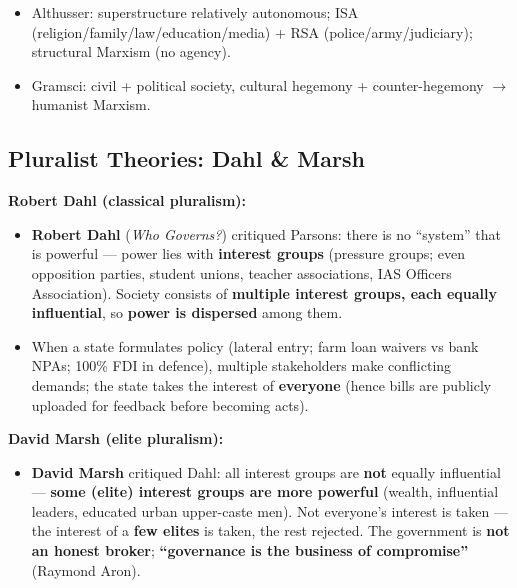 \begin{QuickRevision}
\begin{itemize}
\item Althusser: superstructure relatively autonomous; ISA (religion/family/law/education/media) + RSA (police/army/judiciary); structural Marxism (no agency).
\item Gramsci: civil + political society, cultural hegemony + counter-hegemony $\rightarrow$ humanist Marxism.
\end{itemize}
\end{QuickRevision}

\sectiondivider

\subsection{Pluralist Theories: Dahl \& Marsh}

\begin{KeyConcept}
\textbf{Robert Dahl (classical pluralism):}
\begin{itemize}
\item \textbf{Robert Dahl} (\textit{Who Governs?}) critiqued Parsons: there is no ``system'' that is powerful --- power lies with \textbf{interest groups} (pressure groups; even opposition parties, student unions, teacher associations, IAS Officers Association). Society consists of \textbf{multiple interest groups, each equally influential}, so \textbf{power is dispersed} among them.
\item When a state formulates policy (lateral entry; farm loan waivers vs bank NPAs; 100\% FDI in defence), multiple stakeholders make conflicting demands; the state takes the interest of \textbf{everyone} (hence bills are publicly uploaded for feedback before becoming acts).
\end{itemize}
\end{KeyConcept}

\begin{KeyConcept}
\textbf{David Marsh (elite pluralism):}
\begin{itemize}
\item \textbf{David Marsh} critiqued Dahl: all interest groups are \textbf{not} equally influential --- \textbf{some (elite) interest groups are more powerful} (wealth, influential leaders, educated urban upper-caste men). Not everyone's interest is taken --- the interest of a \textbf{few elites} is taken, the rest rejected. The government is \textbf{not an honest broker}; \textbf{``governance is the business of compromise''} (Raymond Aron).
\end{itemize}
\end{KeyConcept}

